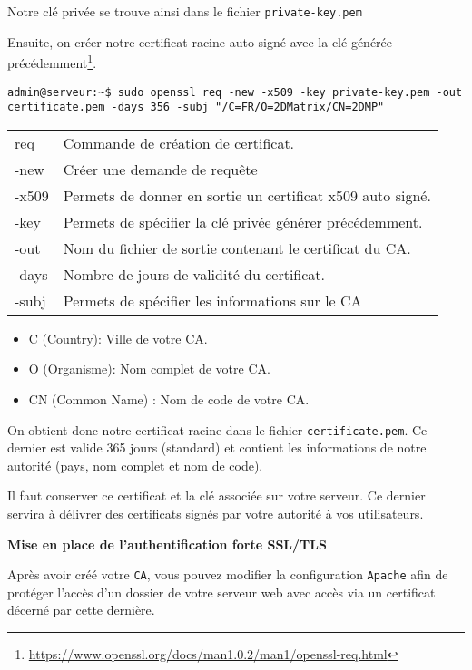 Notre clé privée se trouve ainsi dans le fichier \texttt{private-key.pem}

Ensuite, on créer notre certificat racine auto-signé avec la clé générée précédemment\footnote{\url{https://www.openssl.org/docs/man1.0.2/man1/openssl-req.html}}.
\begin{verbatim}
admin@serveur:~$ sudo openssl req -new -x509 -key private-key.pem -out certificate.pem -days 356 -subj "/C=FR/O=2DMatrix/CN=2DMP"
\end{verbatim}

\begin{tabular}{l|p{10cm}}
    req & Commande de création de certificat.\\
    -new & Créer une demande de requête\\
    -x509 & Permets de donner en sortie un certificat x509 auto signé.\\
    -key & Permets de spécifier la clé privée générer précédemment.\\
    -out & Nom du fichier de sortie contenant le certificat du CA.\\
    -days & Nombre de jours de validité du certificat.\\
    -subj & Permets de spécifier les informations sur le CA\\
\end{tabular}

\begin{itemize}
    \item C (Country): Ville de votre CA.
    \item O (Organisme): Nom complet de votre CA.
    \item CN (Common Name) : Nom de code de votre CA.
\end{itemize}

On obtient donc notre certificat racine dans le fichier \texttt{certificate.pem}. Ce dernier est valide 365 jours (standard) et contient les informations de notre autorité (pays, nom complet et nom de code). 

Il faut conserver ce certificat et la clé associée sur votre serveur. Ce dernier servira à délivrer des certificats signés par votre autorité à vos utilisateurs.

\newpage
\textbf{Mise en place de l'authentification forte SSL/TLS}

Après avoir créé votre \texttt{CA}, vous pouvez modifier la configuration \texttt{Apache} afin de protéger l'accès d'un dossier de votre serveur web avec accès via un certificat décerné par cette dernière.

